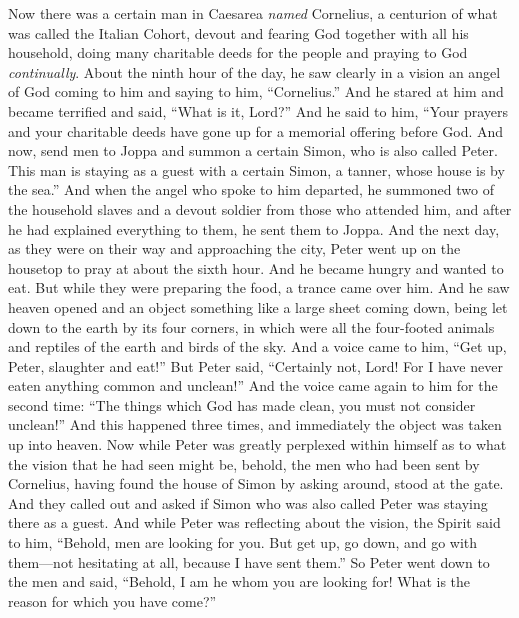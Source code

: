 \begin{biblechapter} %
 Now there was a certain man in Caesarea \textit{named} Cornelius, a centurion of what was called the Italian Cohort,
\verse devout and fearing God together with all his household, doing many charitable deeds for the people and praying to God \textit{continually}.
\verse About the ninth hour of the day, he saw clearly in a vision an angel of God coming to him and saying to him, “Cornelius.”
\verse And he stared at him and became terrified and said, “What is it, Lord?” And he said to him, “Your prayers and your charitable deeds have gone up for a memorial offering before God.
\verse And now, send men to Joppa and summon a certain Simon, who is also called Peter.
\verse This man is staying as a guest with a certain Simon, a tanner, whose house is by the sea.”
\verse And when the angel who spoke to him departed, he summoned two of the household slaves and a devout soldier from those who attended him,
\verse and after he had explained everything to them, he sent them to Joppa.
 And the next day, as they were on their way and approaching the city, Peter went up on the housetop to pray at about the sixth hour.
\verse And he became hungry and wanted to eat. But while they were preparing the food, a trance came over him.
\verse And he saw heaven opened and an object something like a large sheet coming down, being let down to the earth by its four corners,
\verse in which were all the four-footed animals and reptiles of the earth and birds of the sky.
\verse And a voice came to him, “Get up, Peter, slaughter and eat!”
\verse But Peter said, “Certainly not, Lord! For I have never eaten anything common and unclean!”
\verse And the voice came again to him for the second time: “The things which God has made clean, you must not consider unclean!”
\verse And this happened three times, and immediately the object was taken up into heaven.
\verse Now while Peter was greatly perplexed within himself as to what the vision that he had seen might be, behold, the men who had been sent by Cornelius, having found the house of Simon by asking around, stood at the gate.
\verse And they called out and asked if Simon who was also called Peter was staying there as a guest.
\verse And while Peter was reflecting about the vision, the Spirit said to him, “Behold, men are looking for you.
\verse But get up, go down, and go with them—not hesitating at all, because I have sent them.”
\verse So Peter went down to the men and said, “Behold, I am he whom you are looking for! What is the reason for which you have come?”

\end{biblechapter}
